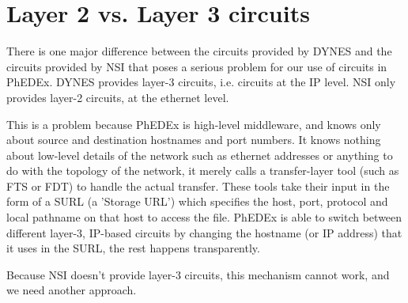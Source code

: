 \section{Layer 2 vs. Layer 3 circuits}

There is one major difference between the circuits provided by DYNES and the circuits provided by NSI that poses a serious problem for our use of circuits in PhEDEx. DYNES provides layer-3 circuits, i.e. circuits at the IP level. NSI only provides layer-2 circuits, at the ethernet level.

This is a problem because PhEDEx is high-level middleware, and knows only about source and destination hostnames and port numbers. It knows nothing about low-level details of the network such as ethernet addresses or anything to do with the topology of the network, it merely calls a transfer-layer tool (such as FTS\cite{FTS} or FDT\cite{FDT}) to handle the actual transfer. These tools take their input in the form of a SURL (a 'Storage URL') which specifies the host, port, protocol and local pathname on that host to access the file. PhEDEx is able to switch between different layer-3, IP-based circuits by changing the hostname (or IP address) that it uses in the SURL, the rest happens transparently.

Because NSI doesn't provide layer-3 circuits, this mechanism cannot work, and we need another approach.